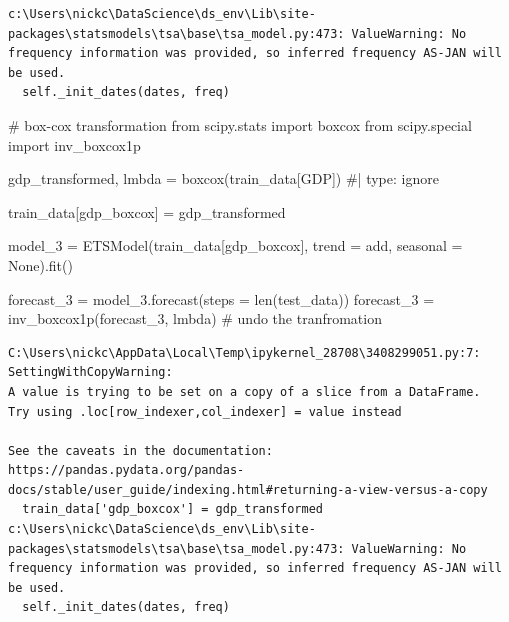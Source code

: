 \documentclass[
  11pt,
]{article}
\newenvironment{Shaded}{\begin{snugshade}}{\end{snugshade}}
\newcommand{\BuiltInTok}[1]{\textcolor[rgb]{0.00,0.23,0.31}{#1}}
\newcommand{\CommentTok}[1]{\textcolor[rgb]{0.37,0.37,0.37}{#1}}
\newcommand{\ImportTok}[1]{\textcolor[rgb]{0.00,0.46,0.62}{#1}}
\newcommand{\NormalTok}[1]{\textcolor[rgb]{0.00,0.23,0.31}{#1}}
\newcommand{\OperatorTok}[1]{\textcolor[rgb]{0.37,0.37,0.37}{#1}}
\newcommand{\StringTok}[1]{\textcolor[rgb]{0.13,0.47,0.30}{#1}}
\newcommand{\VariableTok}[1]{\textcolor[rgb]{0.07,0.07,0.07}{#1}}
\begin{document}
\begin{verbatim}
c:\Users\nickc\DataScience\ds_env\Lib\site-packages\statsmodels\tsa\base\tsa_model.py:473: ValueWarning: No frequency information was provided, so inferred frequency AS-JAN will be used.
  self._init_dates(dates, freq)
\end{verbatim}

\begin{Shaded}
\begin{Highlighting}[]
\CommentTok{\# box{-}cox transformation}
\ImportTok{from}\NormalTok{ scipy.stats }\ImportTok{import}\NormalTok{ boxcox}
\ImportTok{from}\NormalTok{ scipy.special }\ImportTok{import}\NormalTok{ inv\_boxcox1p}

\NormalTok{gdp\_transformed, lmbda }\OperatorTok{=}\NormalTok{ boxcox(train\_data[}\StringTok{\textquotesingle{}GDP\textquotesingle{}}\NormalTok{]) }\CommentTok{\#| type: ignore}

\NormalTok{train\_data[}\StringTok{\textquotesingle{}gdp\_boxcox\textquotesingle{}}\NormalTok{] }\OperatorTok{=}\NormalTok{ gdp\_transformed}

\NormalTok{model\_3 }\OperatorTok{=}\NormalTok{ ETSModel(train\_data[}\StringTok{\textquotesingle{}gdp\_boxcox\textquotesingle{}}\NormalTok{], trend }\OperatorTok{=} \StringTok{\textquotesingle{}add\textquotesingle{}}\NormalTok{, seasonal }\OperatorTok{=} \VariableTok{None}\NormalTok{).fit()}

\NormalTok{forecast\_3 }\OperatorTok{=}\NormalTok{ model\_3.forecast(steps }\OperatorTok{=} \BuiltInTok{len}\NormalTok{(test\_data))}
\NormalTok{forecast\_3 }\OperatorTok{=}\NormalTok{ inv\_boxcox1p(forecast\_3, lmbda) }\CommentTok{\# undo the tranfromation}
\end{Highlighting}
\end{Shaded}

\begin{verbatim}
C:\Users\nickc\AppData\Local\Temp\ipykernel_28708\3408299051.py:7: SettingWithCopyWarning: 
A value is trying to be set on a copy of a slice from a DataFrame.
Try using .loc[row_indexer,col_indexer] = value instead

See the caveats in the documentation: https://pandas.pydata.org/pandas-docs/stable/user_guide/indexing.html#returning-a-view-versus-a-copy
  train_data['gdp_boxcox'] = gdp_transformed
c:\Users\nickc\DataScience\ds_env\Lib\site-packages\statsmodels\tsa\base\tsa_model.py:473: ValueWarning: No frequency information was provided, so inferred frequency AS-JAN will be used.
  self._init_dates(dates, freq)
\end{verbatim}
\end{document}
